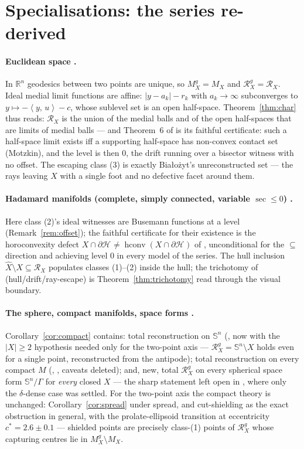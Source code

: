 \documentclass[11pt]{article}
\theoremstyle{remark}
\newcommand{\R}{\mathbb{R}}
\newcommand{\X}{X}
\newcommand{\Xhat}{\widehat{\X}}
\newcommand{\Mx}{M_{\X}}
\newcommand{\Mg}{M^{g}_{\X}}
\newcommand{\Rx}{\mathcal{R}_{\X}}
\newcommand{\Rg}{\mathcal{R}^{g}_{\X}}
\newcommand{\Hb}[1]{\mathcal{H}_{#1}}
\newcommand{\hconv}{\operatorname{hconv}}
\newcommand{\sect}{\operatorname{sec}}
\newcommand{\sca}[2]{\left\langle #1,\, #2\right\rangle}
\newcommand{\Sn}{\mathbb{S}^{n}}
\begin{document}
\section{Specialisations: the series re-derived}\label{sec:spec}

\paragraph{Euclidean space \cite{Bia}.} In $\R^{n}$ geodesics between
two points are unique, so $\Mg=\Mx$ and $\Rg=\Rx$. Ideal medial limit
functions are affine: $|y-a_{k}|-r_{k}$ with $a_{k}\to\infty$
subconverges to $y\mapsto-\sca{y}{u}-c$, whose sublevel set is an open
half-space. Theorem~\ref{thm:char} thus reads: $\Rx$ is the union of
the medial balls and of the open half-spaces that are limits of medial
balls --- and Theorem~6 of \cite{Bia} is its faithful certificate:
such a half-space limit exists iff a supporting half-space has
non-convex contact set (Motzkin), and the level is then $0$, the drift
running over a bisector witness with no offset. The escaping class
(3) is exactly Bia\l{}o\.zyt's unreconstructed set --- the rays
leaving $\X$ with a single foot and no defective facet around them.

\paragraph{Hadamard manifolds (complete, simply connected, variable
$\sect\le0$) \cite{R1,R2,R3}.} Here class (2)'s
ideal witnesses are Busemann functions at a level
(Remark~\ref{rem:offset}); the faithful certificate for their
existence is the horoconvexity defect
$\X\cap\partial\Hb{}\neq\hconv(\X\cap\partial\Hb{})$ of
\cite[Thm.~3.3--3.4]{R3}, unconditional for the $\subseteq$ direction
and achieving level $0$ in every model of the series. The hull
inclusion $\Xhat\setminus\X\subseteq\Rx$ \cite[Thm.~3.1]{R1} populates
classes (1)--(2) inside the hull; the trichotomy of
\cite[Thm.~2.1]{R3} (hull/drift/ray-escape) is
Theorem~\ref{thm:trichotomy} read through the visual boundary.

\paragraph{The sphere, compact manifolds, space forms
\cite{Sph,Tri}.} Corollary~\ref{cor:compact} contains: total
reconstruction on $\Sn$ (\cite[Thm.~4.1]{Sph}, now with the $|\X|\ge2$
hypothesis needed only for the two-point axis --- $\Rg=\Sn\setminus\X$
holds even for a single point, reconstructed from the antipode);
total reconstruction on every compact $M$
(\cite[Thm.~8.3]{Sph}, \cite[Thm.~6.4]{Tri}, caveats deleted); and,
new, total $\Rg$ on every spherical space form $\Sn/\Gamma$ for
\emph{every} closed $\X$ --- the sharp statement left open in
\cite[Rem.~7.3]{Sph}, where only the $\delta$-dense case was settled.
For the two-point axis the compact theory is unchanged:
Corollary~\ref{cor:spread} under spread, and cut-shielding as the
exact obstruction in general, with the prolate-ellipsoid transition at
eccentricity $c^{\ast}=2.6\pm0.1$ \cite[Rem.~6.6]{Tri} --- shielded
points are precisely class-(1) points of $\Rg$ whose capturing centres
lie in $\Mg\setminus\Mx$.
\end{document}
